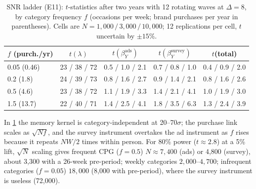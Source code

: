 \begin{table}[htbp]
\centering\small
\caption{SNR ladder (E11): $t$-statistics after two years with 12 rotating waves at $\Delta = 8$, by category frequency $f$ (occasions per week; brand purchases per year in parentheses). Cells are $N = 1{,}000\,/\,3{,}000\,/\,10{,}000$; 12 replications per cell, $t$ uncertain by $\pm 15\%$.}
\label{panel:tab:ladder}
\begin{tabular}{lcccc}
\toprule
$f$ (purch./yr) & $t(\lambda)$ & $t(\beta_Y^{\mathrm{ads}})$ & $t(\beta_Y^{\mathrm{survey}})$ & $t$(total) \\
\midrule
0.05 (0.46) & 23 / 38 / 72 & 0.5 / 1.0 / 2.1 & 0.7 / 0.8 / 1.0 & 0.4 / 0.9 / 2.0 \\
0.2 (1.8) & 24 / 39 / 73 & 0.8 / 1.6 / 2.7 & 0.9 / 1.4 / 2.1 & 0.8 / 1.6 / 2.6 \\
0.5 (4.6) & 23 / 38 / 72 & 1.1 / 1.9 / 3.3 & 1.4 / 2.1 / 4.1 & 1.0 / 1.9 / 3.0 \\
1.5 (13.7) & 22 / 40 / 71 & 1.4 / 2.5 / 4.1 & 1.8 / 3.5 / 6.3 & 1.3 / 2.4 / 3.9 \\
\bottomrule
\end{tabular}
\end{table}

In \cref{panel:tab:ladder} the memory kernel is category-independent at 20--70$\sigma$; the purchase link scales as $\sqrt{Nf}$, and the survey instrument overtakes the ad instrument as $f$ rises because it repeats $NW/2$ times within person. For 80\% power ($t \approx 2.8$) at a 5\% lift, $\sqrt N$ scaling gives frequent CPG ($f = 0.5$) $N \approx 7{,}400$ (ads) or 4,800 (survey), about 3,300 with a 26-week pre-period; weekly categories $2{,}000$--$4{,}700$; infrequent categories ($f = 0.05$) $18{,}000$ (8,000 with pre-period), where the survey instrument is useless (72,000).

